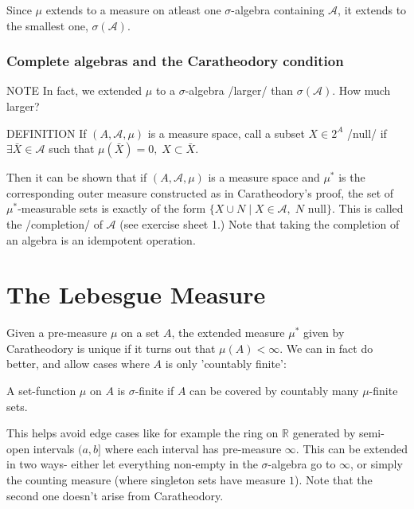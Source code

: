 \documentclass[9pt]{report}
\newtheorem[L]{theorem}{Theorem}[chapter]
\newtheorem[L,nocut]{definition}[theorem]{Definition}
\newtheorem[S,nounderline]{remark}[theorem]{Remarks}
\begin{document}
Since \(\mu\) extends to a measure on atleast one \(\sigma\)-algebra containing \(\mathcal{A}\), it extends to the smallest one, \(\sigma(\mathcal{A})\).

\subsubsection{Complete algebras and the Caratheodory condition}
NOTE In fact, we extended \(\mu\) to a \(\sigma\)-algebra /larger/ than \(\sigma(\mathcal{A})\). How much larger?

    DEFINITION If \((A,\mathcal{A},\mu)\) is a measure space, call a subset \(X\in 2^A\) /null/ if \(\exists \bar{X}\in \mathcal{A}\) such that \(\mu(\bar{X})=0, \; X \subset \bar{X}\).

    Then it can be shown that if \((A,\mathcal{A},\mu)\) is a measure space and \(\mu^*\) is the corresponding outer measure constructed as in Caratheodory's proof, the set of \(\mu^*\)-measurable sets is exactly of the form \(\{X\cup N \; | \; X \in \mathcal{A}, \; N \text{ null} \} \). This is called the /completion/ of \(\mathcal{A}\) (see exercise sheet 1.) Note that taking the completion of an algebra is an idempotent operation.

\section{The Lebesgue Measure} 

Given a pre-measure \(\mu\) on a set \(A\), the extended measure \(\mu^*\) given by Caratheodory is unique if it turns out that \(\mu(A)<\infty\). We can in fact do better, and allow cases where \(A\) is only 'countably finite': 

\begin{definition}
	A set-function \(\mu\) on \(A\) is \(\sigma\)-finite if \(A\) can be covered by countably many \(\mu\)-finite sets. 
\end{definition}

\begin{remark}
	This helps avoid edge cases like for example the ring on \(\mathbb{R}\) generated by semi-open intervals \((a,b]\) where each interval has pre-measure \(\infty\). This can be extended in two ways- either let everything non-empty in the \(\sigma\)-algebra go to \(\infty\), or simply the counting measure (where singleton sets have measure \(1\)). Note that the second one doesn't arise from Caratheodory.
\end{remark}
\end{document}
